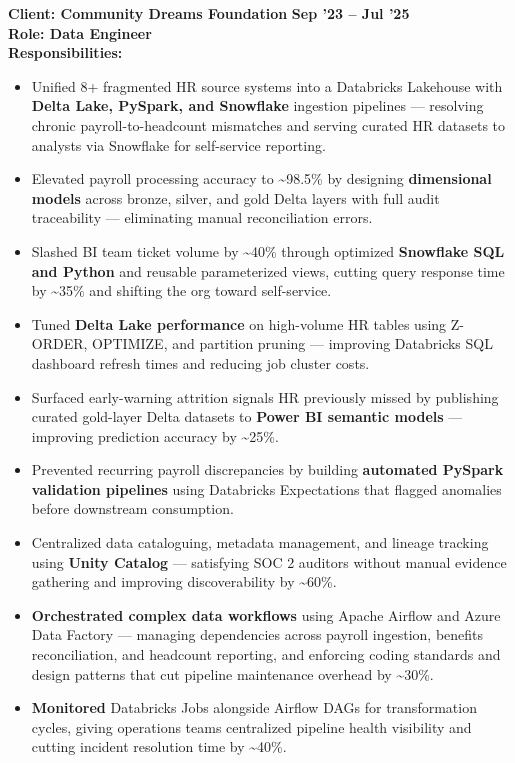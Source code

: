 \documentclass[a4paper,10pt]{article}
\begin{document}
\vspace{0.5cm}
\textbf{Client: Community Dreams Foundation} \hfill \textbf{Sep '23 – Jul '25} \\
\textbf{Role: Data Engineer} \\
\textbf{Responsibilities:}
\begin{itemize}
    \item Unified 8+ fragmented HR source systems into a Databricks Lakehouse with \textbf{Delta Lake, PySpark, and Snowflake} ingestion pipelines — resolving chronic payroll-to-headcount mismatches and serving curated HR datasets to analysts via Snowflake for self-service reporting.
    \item Elevated payroll processing accuracy to \textasciitilde 98.5\% by designing \textbf{dimensional models} across bronze, silver, and gold Delta layers with full audit traceability — eliminating manual reconciliation errors.
    \item Slashed BI team ticket volume by \textasciitilde 40\% through optimized \textbf{Snowflake SQL and Python} and reusable parameterized views, cutting query response time by \textasciitilde 35\% and shifting the org toward self-service.
    \item Tuned \textbf{Delta Lake performance} on high-volume HR tables using Z-ORDER, OPTIMIZE, and partition pruning — improving Databricks SQL dashboard refresh times and reducing job cluster costs.
    \item Surfaced early-warning attrition signals HR previously missed by publishing curated gold-layer Delta datasets to \textbf{Power BI semantic models} — improving prediction accuracy by \textasciitilde 25\%.
    \item Prevented recurring payroll discrepancies by building \textbf{automated PySpark validation pipelines} using Databricks Expectations that flagged anomalies before downstream consumption.
    \item Centralized data cataloguing, metadata management, and lineage tracking using \textbf{Unity Catalog} — satisfying SOC 2 auditors without manual evidence gathering and improving discoverability by \textasciitilde 60\%.
    \item \textbf{Orchestrated complex data workflows} using Apache Airflow and Azure Data Factory — managing dependencies across payroll ingestion, benefits reconciliation, and headcount reporting, and enforcing coding standards and design patterns that cut pipeline maintenance overhead by \textasciitilde 30\%.
    \item \textbf{Monitored} Databricks Jobs alongside Airflow DAGs for transformation cycles, giving operations teams centralized pipeline health visibility and cutting incident resolution time by \textasciitilde 40\%.

\end{itemize}
\end{document}
